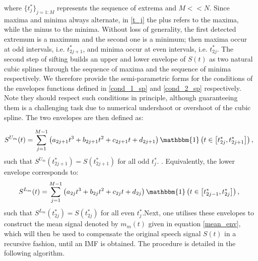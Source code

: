 where $ \{ t_j^{*} \}_{j = 1: M}$ represents the sequence of extrema and $M << N$. Since maxima and minima always alternate, in \ref{t_j} the plus refers to the maxima, while the minus to the minima. Without loss of generality, the first detected extremum is a maximum and the second one is a minimum; then maxima occur at odd intervals, i.e. $t^*_{2j+1}$, and minima occur at even intervals, i.e. $t^*_{2j}$. The second step of sifting builds an upper and lower envelope of $S(t)$ as two natural cubic splines through the sequence of maxima and the sequence of minima respectively. We therefore provide the semi-parametric forms for the conditions of the envelopes functions defined in \ref{cond_1_sp} and \ref{cond_2_sp} respectively. Note they should respect such conditions in principle, although guaranteeing them is a challenging task due to numerical undershoot or overshoot of the cubic spline. The two envelopes are then defined as:

\begin{equation}
\label{upper_env}
S^{U_m}(t) = \sum_{j=1}^{M-1} \left( a_{2j+1}  t^3 + b_{2j+1} t^2 + c_{2j+1} t  +d_{2j+1} \right) \mathbbm{1} \left( t \in \left[ t^*_{2j}, t^*_{2j+1} \right] \right),
\end{equation}
such that $S^{U_m} (t^*_{2j+1}) = S(t^*_{2j+1})$ for all odd $ t^*_{j}$. . Equivalently, the lower envelope corresponds to:
\begin{equation}
\label{lower_env}
S^{L_m}(t) = \sum_{j=1}^{M-1} \left( a_{2j}  t^3 + b_{2j} t^2 + c_{2j} t  +d_{2j} \right)   \mathbbm{1} \left( t \in \left[ t^*_{2j-1}, t^*_{2j} \right] \right),
\end{equation}
such that $S^{L_m} (t^*_{2j}) = S(t^*_{2j})$ for all even $ t_j^*$.Next, one utilises these envelopes to construct the mean signal denoted by $m_m(t)$ given in equation \ref{mean_env}, which will then be used to compensate the original speech signal $S(t)$ in a recursive fashion, until an IMF is obtained.  The procedure is detailed in the following algorithm.

